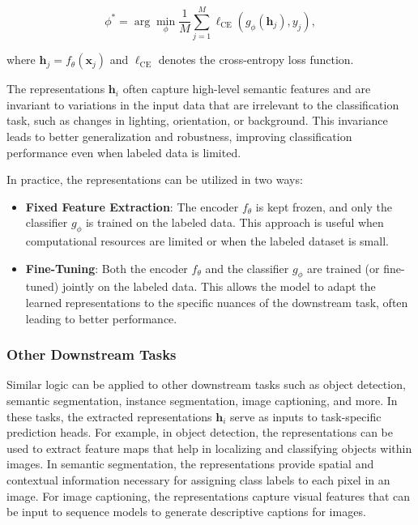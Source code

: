 \[
\phi^* = \arg \min_{\phi} \frac{1}{M} \sum_{j=1}^M \ell_{\text{CE}}(g_{\phi}(\mathbf{h}_j), y_j),
\]

where \( \mathbf{h}_j = f_{\theta}(\mathbf{x}_j) \) and \( \ell_{\text{CE}} \) denotes the cross-entropy loss function.

The representations \( \mathbf{h}_i \) often capture high-level semantic features and are invariant to variations in the input data that are irrelevant to the classification task, such as changes in lighting, orientation, or background. This invariance leads to better generalization and robustness, improving classification performance even when labeled data is limited.

In practice, the representations can be utilized in two ways:

\begin{itemize}
    \item \textbf{Fixed Feature Extraction}: The encoder \( f_{\theta} \) is kept frozen, and only the classifier \( g_{\phi} \) is trained on the labeled data. This approach is useful when computational resources are limited or when the labeled dataset is small.
    \item \textbf{Fine-Tuning}: Both the encoder \( f_{\theta} \) and the classifier \( g_{\phi} \) are trained (or fine-tuned) jointly on the labeled data. This allows the model to adapt the learned representations to the specific nuances of the downstream task, often leading to better performance.
\end{itemize}

\subsubsection{Other Downstream Tasks}

Similar logic can be applied to other downstream tasks such as object detection, semantic segmentation, instance segmentation, image captioning, and more. In these tasks, the extracted representations \( \mathbf{h}_i \) serve as inputs to task-specific prediction heads. For example, in object detection, the representations can be used to extract feature maps that help in localizing and classifying objects within images. In semantic segmentation, the representations provide spatial and contextual information necessary for assigning class labels to each pixel in an image. For image captioning, the representations capture visual features that can be input to sequence models to generate descriptive captions for images.

